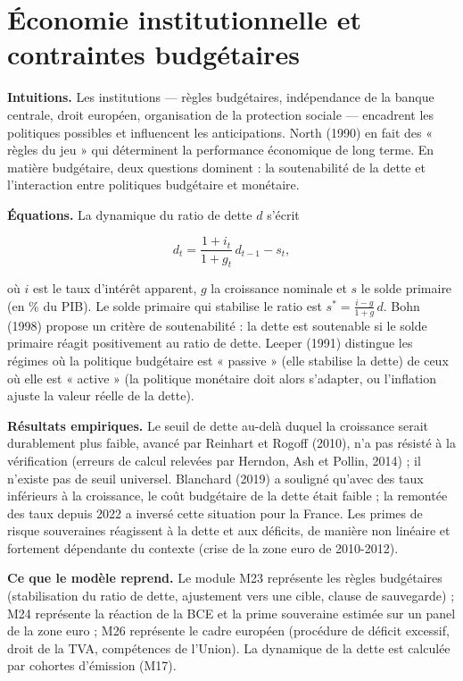 \documentclass[
  11pt,
  11pt,
  a4paper,
  openany]{book}
\begin{document}
\hypertarget{sec:institutions}{%
\section{Économie institutionnelle et contraintes
budgétaires}\label{sec:institutions}}

\textbf{Intuitions.} Les institutions --- règles budgétaires,
indépendance de la banque centrale, droit européen, organisation de la
protection sociale --- encadrent les politiques possibles et influencent
les anticipations. North (1990) en fait des « règles du jeu » qui
déterminent la performance économique de long terme. En matière
budgétaire, deux questions dominent : la soutenabilité de la dette et
l'interaction entre politiques budgétaire et monétaire.

\textbf{Équations.} La dynamique du ratio de dette \(d\) s'écrit

\[d_t = \frac{1 + i_t}{1 + g_t}\,d_{t-1} - s_t,\]

où \(i\) est le taux d'intérêt apparent, \(g\) la croissance nominale et
\(s\) le solde primaire (en \% du PIB). Le solde primaire qui stabilise
le ratio est \(s^* = \frac{i - g}{1 + g}\,d\). Bohn (1998) propose un
critère de soutenabilité : la dette est soutenable si le solde primaire
réagit positivement au ratio de dette. Leeper (1991) distingue les
régimes où la politique budgétaire est « passive » (elle stabilise la
dette) de ceux où elle est « active » (la politique monétaire doit alors
s'adapter, ou l'inflation ajuste la valeur réelle de la dette).

\textbf{Résultats empiriques.} Le seuil de dette au-delà duquel la
croissance serait durablement plus faible, avancé par Reinhart et Rogoff
(2010), n'a pas résisté à la vérification (erreurs de calcul relevées
par Herndon, Ash et Pollin, 2014) ; il n'existe pas de seuil universel.
Blanchard (2019) a souligné qu'avec des taux inférieurs à la croissance,
le coût budgétaire de la dette était faible ; la remontée des taux
depuis 2022 a inversé cette situation pour la France. Les primes de
risque souveraines réagissent à la dette et aux déficits, de manière non
linéaire et fortement dépendante du contexte (crise de la zone euro de
2010-2012).

\textbf{Ce que le modèle reprend.} Le module M23 représente les règles
budgétaires (stabilisation du ratio de dette, ajustement vers une cible,
clause de sauvegarde) ; M24 représente la réaction de la BCE et la prime
souveraine estimée sur un panel de la zone euro ; M26 représente le
cadre européen (procédure de déficit excessif, droit de la TVA,
compétences de l'Union). La dynamique de la dette est calculée par
cohortes d'émission (M17).
\end{document}
